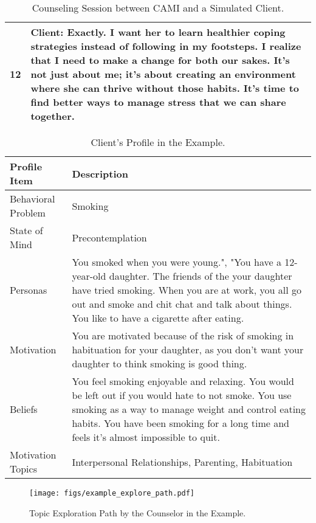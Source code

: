 \begin{table*}[ht]
\begin{tabularx}{\textwidth}{c X}
12      & Client: Exactly. I want her to learn healthier coping strategies instead of following in my footsteps. I realize that I need to make a change for both our sakes. It’s not just about me; it’s about creating an environment where she can thrive without those habits. It's time to find better ways to manage stress that we can share together.   
\\ \bottomrule
\end{tabularx}
\caption{Counseling Session between CAMI and a Simulated Client.}
\label{tab:example}
\end{table*}



\begin{table*}[ht]
\centering
\begin{tabularx}{\textwidth}{l X}
\toprule
{\bf Profile Item}        & {\bf Description}                     \\ \midrule
Behavioral Problem  & Smoking \\ \hline
State of Mind       & Precontemplation \\ \hline
Personas            & You smoked when you were young.", "You have a 12-year-old daughter. \newline The friends of the your daughter have tried smoking. \newline When you are at work, you all go out and smoke and chit chat and talk about things. \newline You like to have a cigarette after eating. \\ \hline
Motivation          & You are motivated because of the risk of smoking in habituation for your daughter, as you don't want your daughter to think smoking is good thing.    \\ \hline
Beliefs             & You feel smoking enjoyable and relaxing. \newline You would be left out if you would hate to not smoke. \newline You use smoking as a way to manage weight and control eating habits. \newline You have been smoking for a long time and feels it's almost impossible to quit. \\ \hline
Motivation Topics          & Interpersonal Relationships, Parenting, Habituation
\\ \bottomrule
\end{tabularx}
\caption{Client's Profile in the Example.}
\label{tab:example profile}
\end{table*}


\begin{figure*}
    \centering
    \texttt{[image: figs/example\_explore\_path.pdf]}
    \caption{Topic Exploration Path by the Counselor in the Example.}
    \label{fig:exploration path}
\end{figure*}


